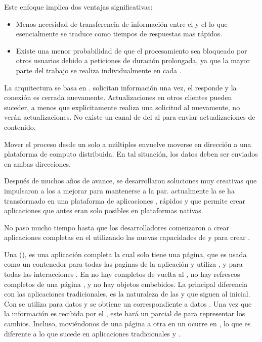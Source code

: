 Este enfoque \clientcentric implica dos ventajas significativas:
\begin{itemize}
	\item Menos necesidad de transferencia de información entre el \server y el \client lo que esencialmente se traduce como tiempos de respuestas mas rápidos.
	\item Existe una menor probabilidad de que el procesamiento sea bloqueado por otros usuarios debido a peticiones de duración prolongada, ya que la mayor parte del trabajo se realiza individualmente en cada \client.
\end{itemize}

La arquitectura \clientserver se basa en \statelessconnections. \clients solicitan información una vez, el \server responde y la conexión es cerrada nuevamente. Actualizaciones en otros clientes pueden suceder, a menos que explicitamente realiza una solicitud al \server nuevamente, no verán actualizaciones. No existe un canal de \feedback del \server al \client para enviar actualizaciones de contenido.

Mover el proceso desde un solo \server a múltiples \clients envuelve moverse en dirección a una plataforma de computo distribuida. En tal situación, los datos deben ser enviados en ambas direcciones.

Después de muchos años de avance, se desarrollaron soluciones muy creativas que impulsaron a los \browsers a mejorar para mantenerse a la par. 
actualmente la \web se ha transformado en una plataforma de aplicaciones \fullyfeatured, \runtimes \javascript rápidos y \standard \htmlfive que permite crear aplicaciones que antes eran solo posibles en plataformas nativas.

No paso mucho tiempo hasta que los desarrolladores comenzaron a crear aplicaciones completas en el \browser utilizando las nuevas capacidades de \javascript y  para crear \singlepageapp.

Una \singlepageapp (\spa), es una aplicación \web completa la cual solo tiene una página, que es usada como un contenedor para todas las paginas \web de la aplicación y utiliza \javascript, \htmlfive y \css para todas las interacciones \frontend. En \spas no hay \posts completos de vuelta al \server, no hay refrescos completos de una página \web, y no hay objetos embebidos. La principal diferencia con las aplicaciones \web tradicionales, es la naturaleza de las \requests y \responses que siguen al \request \http inicial. Con \spa se utiliza \ajax para \request datos y se obtiene un \response correspondiente a datos \json. Una vez que la información es recibida por el \client, este hará un \render parcial de \html para representar los cambios. Incluso, moviéndonos de una página a otra en un \spa ocurre en \clientside, lo que es diferente a lo que sucede en aplicaciones tradicionales y \ria.

